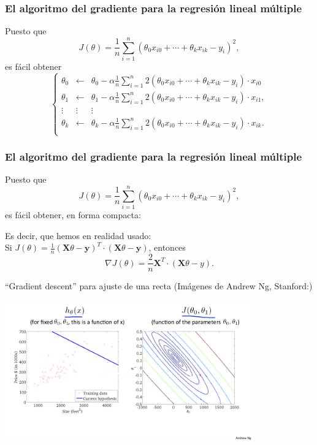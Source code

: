\documentclass[aspectratio=169]{beamer}
\begin{document}
\begin{frame}\frametitle{El algoritmo del gradiente para la regresión lineal múltiple}
\begin{overlayarea}{\textwidth}{7cm}
Puesto que $$J(\theta)=\frac 1 n\sum_{i=1}^n\left(\theta_0x_{i0}+\cdots+\theta_kx_{ik}-y_i\right)^2,$$
es fácil obtener
$$\left\{\begin{array}{lcl}
\theta_0&\leftarrow &\theta_0-\alpha\frac 1 n\sum_{i=1}^n2\left(\theta_0x_{i0}+\cdots+\theta_kx_{ik}-y_i\right)\cdot x_{i0}\\
\theta_1&\leftarrow &\theta_1-\alpha\frac 1 n\sum_{i=1}^n2\left(\theta_0x_{i0}+\cdots+\theta_kx_{ik}-y_i\right)\cdot x_{i1},\\
\vdots&\vdots&\vdots\\
\theta_k&\leftarrow &\theta_k-\alpha\frac 1 n\sum_{i=1}^n2\left(\theta_0x_{i0}+\cdots+\theta_kx_{ik}-y_i\right)\cdot x_{ik}.\\
\end{array}\right.$$

\end{overlayarea}
\end{frame}
\begin{frame}\frametitle{El algoritmo del gradiente para la regresión lineal múltiple}
\begin{overlayarea}{\textwidth}{7cm}
Puesto que $$J(\theta)=\frac 1 n\sum_{i=1}^n\left(\theta_0x_{i0}+\cdots+\theta_kx_{ik}-y_i\right)^2,$$
es fácil obtener, en forma compacta:\vspace{0.5cm}
\begin{center}
\end{center}
 Es decir, que hemos en realidad usado:\\
Si  $J(\theta)=\frac 1 n\left(\mathbf{X}\theta-\mathbf{y}\right)^T\cdot \left(\mathbf{X}\theta-\mathbf{y}\right)$,  entonces $$ \nabla J(\theta)=\frac 2 n\mathbf{X}^T\cdot \left(\mathbf{X}\theta-y\right).$$
\end{overlayarea}


\end{frame}


\begin{frame}{``Gradient descent'' para ajuste de una recta {\scriptsize (Imágenes de Andrew Ng, Stanford:)}}

\begin{center}
  \includegraphics[height=6cm]{ng-gradient1.png}
\end{center}
\end{frame}
\end{document}
